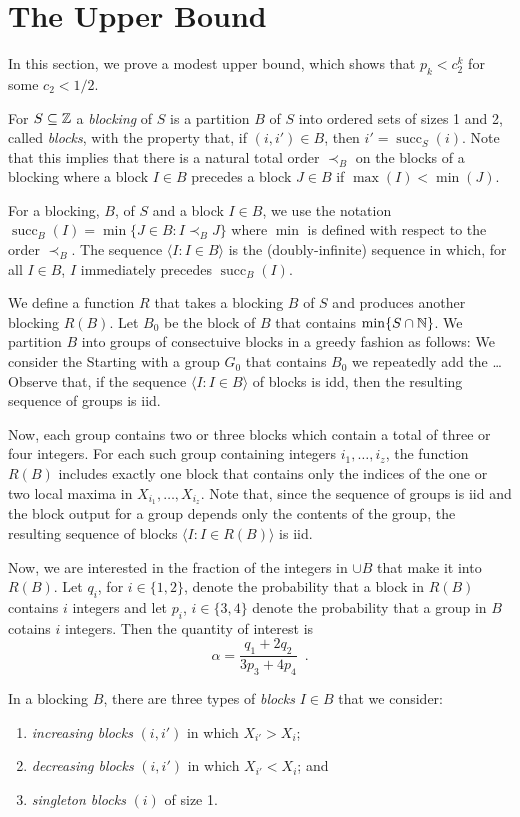 \documentclass{patmorin}
\DeclareMathOperator{\cw}{succ}
\begin{document}
\section{The Upper Bound}

In this section, we prove a modest upper bound, which shows that $p_k <
c_2^k$ for some $c_2<1/2$. 

For $S\subseteq\mathbb{Z}$ a \emph{blocking} of $S$ is a partition $B$ of $S$ into
ordered sets of sizes 1 and 2, called \emph{blocks}, with the property
that, if $(i,i')\in B$, then $i'=\cw_S(i)$.  Note that this implies that
there is a natural total order $\prec_B$ on the blocks of a blocking
where a block $I\in B$ precedes a block $J\in B$ if $\max(I)<\min(J)$.

For a blocking, $B$, of $S$ and a block $I\in B$, we use the notation
$\cw_B(I)=\min\{J\in B: I \prec_B J\}$ where $\min$ is defined with
respect to the order $\prec_B$.  The sequence $\langle I: I\in B\rangle$ is the (doubly-infinite) sequence in which, for all $I\in B$, $I$ immediately precedes $\cw_B(I)$.

We define a function $R$ that takes a blocking $B$ of $S$ and produces
another blocking $R(B)$.  Let $B_0$ be the block of $B$ that contains
$\min\{S\cap \mathbb{N}\}$. We partition $B$ into groups of consectuive blocks
in a greedy fashion as follows:  We consider the Starting with a group
$G_0$ that contains $B_0$ we repeatedly add the \ldots Observe that, if the
sequence $\langle I:I\in B\rangle$ of blocks is idd, then the resulting
sequence of groups is iid.

Now, each group contains two or three blocks which contain a total
of three or four integers.  For each such group containing integers
$i_1,\ldots,i_z$, the function $R(B)$ includes exactly one block
that contains only the indices of the one or two local maxima in
$X_{i_1},\ldots,X_{i_z}$.  Note that, since the sequence of groups is iid
and the block output for a group depends only the contents of the group,
the resulting sequence of blocks $\langle I: I\in R(B)\rangle$ is iid.

Now, we are interested in the fraction of the integers in $\cup B$
that make it into $R(B)$.  Let $q_i$, for $i\in\{1,2\}$, denote the
probability that a block in $R(B)$ contains $i$ integers and let $p_{i}$,
$i\in\{3,4\}$ denote the probability that a group in $B$ cotains $i$
integers. Then the quantity of interest is
\[
    \alpha = \frac{q_1+2q_2}{3p_3 + 4p_4} \enspace .
\]

In a blocking $B$, there are three types of
\emph{blocks} $I\in B$ that we consider:
\begin{enumerate}[label=\alph*)]
\item \emph{increasing blocks} $(i,i')$ in which $X_{i'} > X_{i}$; 
\item \emph{decreasing blocks} $(i,i')$ in which $X_{i'} < X_{i}$; and
\item \emph{singleton blocks} $(i)$ of size 1.
\end{enumerate}
\end{document}

